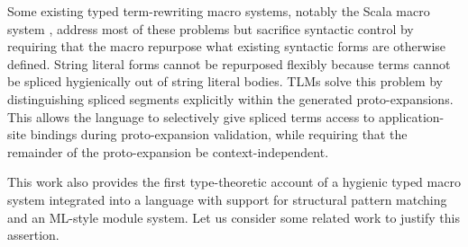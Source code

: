 Some existing typed term-rewriting macro systems, notably the Scala macro system \cite{ScalaMacros2013}, address most of these problems but sacrifice syntactic control by requiring that the macro repurpose what existing syntactic forms are otherwise defined. String literal forms cannot be repurposed flexibly because terms cannot be spliced hygienically out of string literal bodies. TLMs solve this problem by  distinguishing spliced segments explicitly within the generated proto-expansions. This allows the language to selectively give spliced terms access to application-site bindings during proto-expansion validation, while requiring that the remainder of the proto-expansion be context-independent.

This work also provides the first  type-theoretic account of a hygienic typed macro system integrated into a language with support for structural pattern matching and an ML-style module system. Let us consider some related work to justify this assertion.
